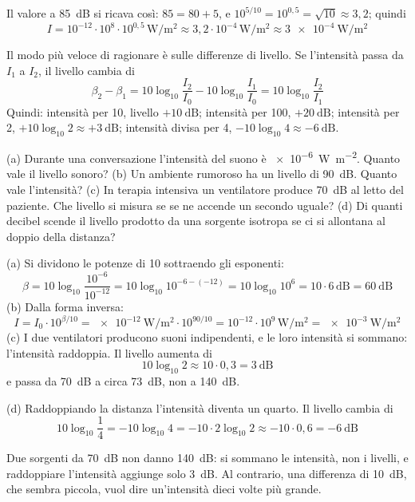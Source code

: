 Il valore a \SI{85}{\deci\bel} si ricava così: $85 = 80 + 5$, e $10^{5/10} = 10^{0,5} = \sqrt{10} \approx 3{,}2$; quindi
\[
  I = 10^{-12} \cdot 10^{8} \cdot 10^{0,5}\,\si{\watt\per\metre\squared} \approx 3{,}2 \cdot 10^{-4}\,\si{\watt\per\metre\squared} \approx \SI{3e-4}{\watt\per\metre\squared}
\]

Il modo più veloce di ragionare è sulle differenze di livello. Se l'intensità passa da $I_1$ a $I_2$, il livello cambia di
\[
  \beta_2 - \beta_1 = 10\log_{10}\frac{I_2}{I_0} - 10\log_{10}\frac{I_1}{I_0} = 10\log_{10}\frac{I_2}{I_1}
\]
Quindi: intensità per 10, livello $+\SI{10}{\deci\bel}$; intensità per 100, $+\SI{20}{\deci\bel}$; intensità per 2, $+10\log_{10} 2 \approx +\SI{3}{\deci\bel}$; intensità divisa per 4, $-10\log_{10} 4 \approx -\SI{6}{\deci\bel}$.

\begin{esempio}
(a) Durante una conversazione l'intensità del suono è \SI{e-6}{\watt\per\metre\squared}. Quanto vale il livello sonoro? (b) Un ambiente rumoroso ha un livello di \SI{90}{\deci\bel}. Quanto vale l'intensità? (c) In terapia intensiva un ventilatore produce \SI{70}{\deci\bel} al letto del paziente. Che livello si misura se se ne accende un secondo uguale? (d) Di quanti decibel scende il livello prodotto da una sorgente isotropa se ci si allontana al doppio della distanza?

(a) Si dividono le potenze di 10 sottraendo gli esponenti:
\[
  \beta = 10 \log_{10}\frac{10^{-6}}{10^{-12}} = 10 \log_{10} 10^{-6-(-12)} = 10 \log_{10} 10^{6} = 10 \cdot 6\,\si{\deci\bel} = \SI{60}{\deci\bel}
\]
(b) Dalla forma inversa:
\[
  I = I_0 \cdot 10^{\beta/10} = \SI{e-12}{\watt\per\metre\squared} \cdot 10^{90/10} = 10^{-12} \cdot 10^{9}\,\si{\watt\per\metre\squared} = \SI{e-3}{\watt\per\metre\squared}
\]
(c) I due ventilatori producono suoni indipendenti, e le loro intensità si sommano: l'intensità raddoppia. Il livello aumenta di
\[
  10 \log_{10} 2 \approx 10 \cdot 0{,}3 = \SI{3}{\deci\bel}
\]
e passa da \SI{70}{\deci\bel} a circa \SI{73}{\deci\bel}, non a \SI{140}{\deci\bel}.

(d) Raddoppiando la distanza l'intensità diventa un quarto. Il livello cambia di
\[
  10 \log_{10}\frac{1}{4} = -10 \log_{10} 4 = -10 \cdot 2\log_{10} 2 \approx -10 \cdot 0{,}6 = \SI{-6}{\deci\bel}
\]
\end{esempio}

\begin{attenzione}
Due sorgenti da \SI{70}{\deci\bel} non danno \SI{140}{\deci\bel}: si sommano le intensità, non i livelli, e raddoppiare l'intensità aggiunge solo \SI{3}{\deci\bel}. Al contrario, una differenza di \SI{10}{\deci\bel}, che sembra piccola, vuol dire un'intensità dieci volte più grande.
\end{attenzione}

